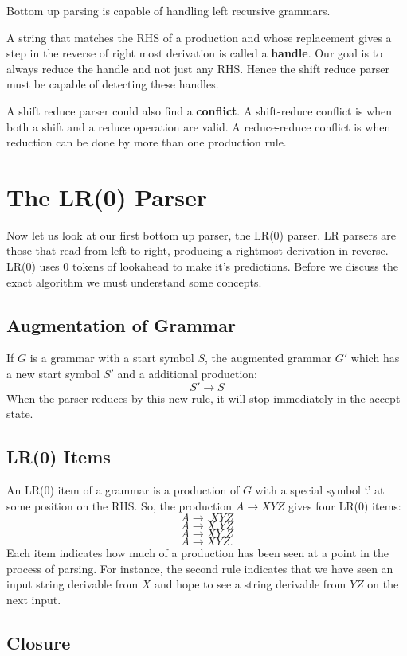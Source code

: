 \documentclass[12pt,letterpaper]{book}
\theoremstyle{definition}
\begin{document}
Bottom up parsing is capable of handling left recursive grammars.

A string that matches the RHS of a production and whose replacement gives a step in the reverse of right most derivation is called a \textbf{handle}. Our goal is to always reduce the handle and not just any RHS. Hence the shift reduce parser must be capable of detecting these handles.

A shift reduce parser could also find a \textbf{conflict}. A shift-reduce conflict is when both a shift and a reduce operation are valid. A reduce-reduce conflict is when reduction can be done by more than one production rule.

\section{The LR(0) Parser}

Now let us look at our first bottom up parser, the LR(0) parser. LR parsers are those that read from left to right, producing a rightmost derivation in reverse. LR(0) uses 0 tokens of lookahead to make it's predictions. Before we discuss the exact algorithm we must understand some concepts.

\subsection{Augmentation of Grammar}

If $G$ is a grammar with a start symbol $S$, the augmented grammar $G'$ which has a new start symbol $S'$ and a additional production:
\[S' \rightarrow S\]
When the parser reduces by this new rule, it will stop immediately in the accept state.

\subsection{LR(0) Items}

An LR(0) item of a grammar is a production of $G$ with a special symbol `.' at some position on the RHS. So, the production $A \rightarrow XYZ$ gives four LR(0) items:
\[A \rightarrow .XYZ\]
\[A \rightarrow X.YZ\]
\[A \rightarrow XY.Z\]
\[A \rightarrow XYZ.\]
Each item indicates how much of a production has been seen at a point in the process of parsing. For instance, the second rule indicates that we have seen an input string derivable from $X$ and hope to see a string derivable from $YZ$ on the next input.

\subsection{Closure}
\end{document}
